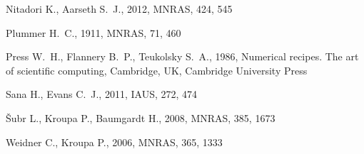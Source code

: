 \documentclass[useAMS,usenatbib]{mn2e}
\begin{document}
\begin{thebibliography}{99}
Nitadori K., Aarseth S.~J., 2012, MNRAS, 424, 545 

Plummer H.~C., 1911, MNRAS, 71, 460 

Press W.~H., Flannery B.~P., Teukolsky S.~A., 1986, Numerical recipes. The art of scientific computing, Cambridge, UK, Cambridge University Press 

Sana H., Evans C.~J., 2011, IAUS, 272, 474 

{\v S}ubr L., Kroupa P., Baumgardt H., 2008, MNRAS, 385, 1673

Weidner C., Kroupa P., 2006, MNRAS, 365, 1333

\end{thebibliography}
                                                                           
\end{document}
